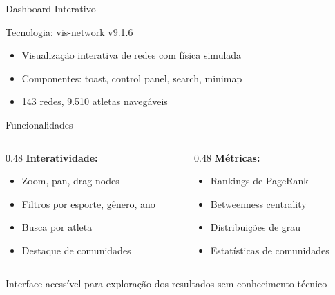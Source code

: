 \begin{frame}[shrink=1]{Dashboard Interativo}
    \begin{block}{Tecnologia: vis-network v9.1.6}
        \footnotesize
        \begin{itemize}
            \item Visualização interativa de redes com física simulada
            \item Componentes: toast, control panel, search, minimap
            \item 143 redes, 9.510 atletas navegáveis
        \end{itemize}
    \end{block}

    \vspace{0.3cm}

    \begin{block}{Funcionalidades}
        \footnotesize
        \begin{columns}[T]
            \begin{column}{0.48\textwidth}
                \textbf{Interatividade:}
                \begin{itemize}
                    \item Zoom, pan, drag nodes
                    \item Filtros por esporte, gênero, ano
                    \item Busca por atleta
                    \item Destaque de comunidades
                \end{itemize}
            \end{column}
            \begin{column}{0.48\textwidth}
                \textbf{Métricas:}
                \begin{itemize}
                    \item Rankings de PageRank
                    \item Betweenness centrality
                    \item Distribuições de grau
                    \item Estatísticas de comunidades
                \end{itemize}
            \end{column}
        \end{columns}
    \end{block}

    \vspace{0.3cm}

    \begin{center}
        \footnotesize
        Interface acessível para exploração dos resultados sem conhecimento técnico
    \end{center}
\end{frame}


